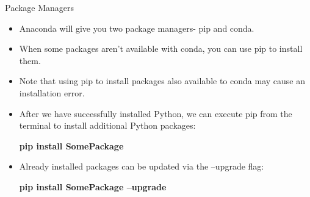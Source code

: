 \documentclass[11pt]{beamer}
\begin{document}
%
%
\begin{frame}{Package Managers}
\begin{itemize}
\item  Anaconda will give you two package managers- pip and conda. 

\item When some packages aren’t available with conda, you can use pip to install them. 

\item Note that using pip to install packages also available to conda may cause an installation error.

\item After we have successfully installed Python, we can execute pip from the terminal to install additional Python packages:
\begin{center}
\textbf{pip install SomePackage}
\end{center}

\item Already installed packages can be updated via the --upgrade flag:
\begin{center}
\textbf{pip install SomePackage --upgrade}
\end{center}

\end{itemize}
\end{frame}
%
\end{document}
